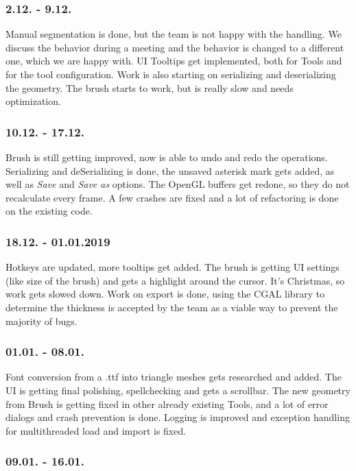 \subsubsection{2.12. - 9.12.}

Manual segmentation is done, but the team is not happy with the handling. We discuss the behavior during a meeting and the behavior is changed to a different one, which we are happy with. UI Tooltips get implemented, both for Tools and for the tool configuration. Work is also starting on serializing and deserializing the geometry. The brush starts to work, but is really slow and needs optimization.

\subsubsection{10.12. - 17.12.}

Brush is still getting improved, now is able to undo and redo the operations. Serializing and deSerializing is done, the unsaved asterisk mark gets added, as well as \textit{Save} and \textit{Save as} options. The OpenGL buffers get redone, so they do not recalculate every frame. A few crashes are fixed and a lot of refactoring is done on the existing code.

\subsubsection{18.12. - 01.01.2019}

Hotkeys are updated, more tooltips get added. The brush is getting UI settings (like size of the brush) and gets a highlight around the cursor. It's Christmas, so work gets slowed down. Work on export is done, using the CGAL library to determine the thickness is accepted by the team as a viable way to prevent the majority of bugs.

\subsubsection{01.01. - 08.01.}

Font conversion from a .ttf into triangle meshes gets researched and added. The UI is getting final polishing, spellchecking and gets a scrollbar. The new geometry from Brush is getting fixed in other already existing Tools, and a lot of error dialogs and crash prevention is done. Logging is improved and exception handling for multithreaded load and import is fixed.

\subsubsection{09.01. - 16.01.}

